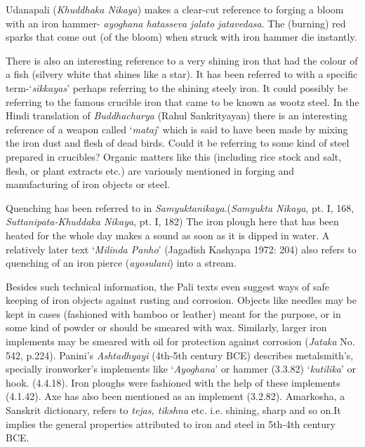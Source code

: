 Udanapali (\textit{Khuddhaka Nikaya}) makes a clear-cut reference to forging a bloom with an iron hammer- \textit{ayoghana hatasseva jalato jatavedasa}. The (burning) red sparks that come out (of the bloom) when struck with iron hammer die instantly.

There is also an interesting reference to a very shining iron that had the colour of a fish (silvery white that shines like a star). It has been referred to with a specific term-‘\textit{sikkayas}’ perhaps referring to the shining steely iron. It could possibly be referring to the famous crucible iron that came to be known as wootz steel. In the Hindi translation of \textit{Buddhacharya} (Rahul Sankrityayan) there is an interesting reference of a weapon called ‘\textit{mataj}’ which is said to have been made by mixing the iron dust and flesh of dead birds. Could it be referring to some kind of steel prepared in crucibles? Organic matters like this (including rice stock and salt, flesh, or plant extracts etc.) are variously mentioned in forging and manufacturing of iron objects or steel.

Quenching has been referred to in \textit{Samyuktanikaya}.(\textit{Samyukta Nikaya}, pt. I, 168, \textit{Suttanipata-Khuddaka Nikaya}, pt. I, 182) The iron plough here that has been heated for the whole day makes a sound as soon as it is dipped in water. A relatively later text ‘\textit{Milinda Panho}’ (Jagadish Kashyapa 1972: 204) also refers to quenching of an iron pierce (\textit{ayosulani}) into a stream.

Besides such technical information, the Pali texts even suggest ways of safe keeping of iron objects against rusting and corrosion. Objects like needles may be kept in cases (fashioned with bamboo or leather) meant for the purpose, or in some kind of powder or should be smeared with wax. Similarly, larger iron implements may be smeared with oil for protection against corrosion (\textit{Jataka} No. 542, p.224). Panini’s \textit{Ashtadhyayi} (4th-5th century BCE) describes metalsmith’s, specially ironworker’s implements like ‘\textit{Ayoghana}’ or hammer (3.3.82) ‘\textit{kutilika}’ or hook. (4.4.18). Iron ploughs were fashioned with the help of these implements (4.1.42). Axe has also been mentioned as an implement (3.2.82). Amarkosha, a Sanskrit dictionary, refers to \textit{tejas, tikshna} etc. i.e. shining, sharp and so on.It implies the general properties attributed to iron and steel in 5th-4th century BCE.

